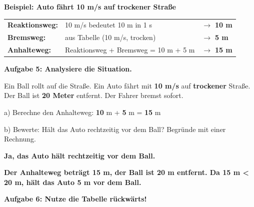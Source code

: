 \documentclass[11pt,a4paper]{article}
\newcommand{\aufgabe}[1]{\textbf{\textcolor{physik}{#1}}}
\newcommand{\lsg}[1]{\textcolor{loesung}{\textbf{#1}}}
\begin{document}
\vspace{0.6em}

\begin{beispielbox}
\textbf{Beispiel: Auto fährt 10 m/s auf trockener Straße}

\vspace{0.3em}
\begin{tabular}{lll}
\textbf{Reaktionsweg:} & 10 m/s bedeutet 10 m in 1 s & $\rightarrow$ \textbf{10 m} \\
\textbf{Bremsweg:} & aus Tabelle (10 m/s, trocken) & $\rightarrow$ \textbf{5 m} \\
\textbf{Anhalteweg:} & Reaktionsweg + Bremsweg = 10 m + 5 m & $\rightarrow$ \textbf{15 m} \\
\end{tabular}
\end{beispielbox}

\vspace{0.5em}

\aufgabe{Aufgabe 5: Analysiere die Situation.}

\vspace{0.2em}
\begin{beispielbox}
Ein Ball rollt auf die Straße. Ein Auto fährt mit \textbf{10 m/s} auf \textbf{trockener} Straße.\\
Der Ball ist \textbf{20 Meter} entfernt. Der Fahrer bremst sofort.
\end{beispielbox}

\vspace{0.2em}
a) Berechne den Anhalteweg: \lsg{10} m + \lsg{5} m = \lsg{15} m

\vspace{0.3em}
b) Bewerte: Hält das Auto rechtzeitig vor dem Ball? Begründe mit einer Rechnung.

\vspace{0.4em}
\lsg{Ja, das Auto hält rechtzeitig vor dem Ball.}

\vspace{0.4em}
\lsg{Der Anhalteweg beträgt 15 m, der Ball ist 20 m entfernt. Da 15 m < 20 m, hält das Auto 5 m vor dem Ball.}

\vspace{0.4em}
\aufgabe{Aufgabe 6: Nutze die Tabelle rückwärts!}
\end{document}
